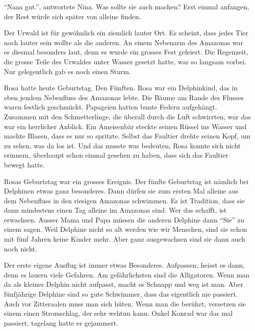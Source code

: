 \enquote{Naaa gut.}, antwortete Nina. Was sollte sie auch machen? Erst einmal anfangen, der Rest würde sich später von alleine finden.

\vspace{10pt}
\centerline{\Huge \Dolphin[DeepPink]}
\vspace{10pt}

Der Urwald ist für gewöhnlich ein ziemlich lauter Ort. Es scheint, dass jedes Tier noch lauter sein wollte als die anderen. An einem Nebenarm des Amazonas war es diesmal besonders laut, denn es wurde ein grosses Fest gefeiert. Die Regenzeit, die grosse Teile des Urwaldes unter Wasser gesetzt hatte, war so langsam vorbei. Nur gelegentlich gab es noch einen Sturm. 

Rosa hatte heute Geburtstag. Den Fünften. Rosa war ein Delphinkind, das in eben jendem Nebenfluss des Amazonas lebte. Die Bäume am Rande des Flusses waren festlich geschmückt. Papageien hatten bunte Federn aufgehängt. Zusammen mit den Schmetterlinge, die überall durch die Luft schwirrten, war das war ein herrlicher Anblick. Ein Ameisenbär steckte seinen Rüssel ins Wasser und machte Blasen, dass es nur so spritzte. Selbst das Faultier drehte seinen Kopf, um zu sehen, was da los ist. Und das musste was bedeuten, Rosa konnte sich nicht erinnern, überhaupt schon einmal gesehen zu haben, dass sich das Faultier bewegt hatte.

Rosas Geburtstag war ein grosses Ereignis. Der fünfte Geburtstag ist nämlich bei Delphinen etwas ganz besonderes. Dann dürfen sie zum ersten Mal alleine aus dem Nebenfluss in den riesigen Amazonas schwimmen. Es ist Tradition, dass sie dann mindestens einen Tag alleine im Amazonas sind. Wer das schafft, ist erwachsen. Ausser Mama und Papa müssen die anderen Delphine dann \enquote{Sie} zu einem sagen. Weil Delphine nicht so alt werden wie wir Menschen, sind sie schon mit fünf Jahren keine Kinder mehr. Aber ganz ausgewachsen sind sie dann auch noch nicht.

Der erste eigene Ausflug ist immer etwas Besonderes. Aufpassen, heisst es dann, denn es lauern viele Gefahren. Am gefährlichsten sind die Alligatoren. Wenn man da als kleiner Delphin nicht aufpasst, macht es Schnapp und weg ist man. Aber fünfjährige Delphine sind so gute Schwimmer, dass das eigentlich nie passiert. Auch vor Zitteraalen muss man sich hüten. Wenn man die berührt, versetzen sie einem einen Stromschlag, der sehr wehtun kann. Onkel Konrad war das mal passiert, tagelang hatte er gejammert.

